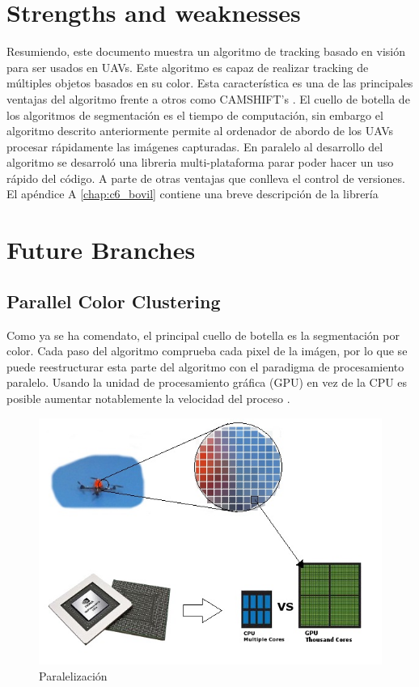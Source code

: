 \section{Strengths and weaknesses}
	Resumiendo, este documento muestra un algoritmo de tracking basado en visi\'on para ser usados en UAVs. Este algoritmo es capaz de realizar tracking de m\'ultiples objetos basados en su color. Esta caracter\'istica es una de las principales ventajas del algoritmo frente a otros como CAMSHIFT's \cite{CAMSHIFT_FAST} \cite{CAMSHIFT_ENVIROMENT}. El cuello de botella de los algoritmos de segmentaci\'on es el tiempo de computaci\'on, sin embargo el algoritmo descrito anteriormente permite al ordenador de abordo de los UAVs procesar r\'apidamente las im\'agenes capturadas.
	En paralelo al desarrollo del algoritmo se desarrol\'o una libreria multi-plataforma parar poder hacer un uso r\'apido del c\'odigo. A parte de otras ventajas que conlleva el control de versiones. El ap\'endice A \ref{chap:c6_bovil} contiene una breve descripci\'on de la librer\'ia
	
\section{Future Branches}	
	\subsection{Parallel Color Clustering}
	Como ya se ha comendato, el principal cuello de botella es la segmentaci\'on por color. Cada paso del algoritmo comprueba cada pixel de la im\'agen, por lo que se puede reestructurar esta parte del algoritmo con el paradigma de procesamiento paralelo. Usando la unidad de procesamiento gr\'afica (GPU) en vez de la CPU es posible aumentar notablemente la velocidad del proceso \cite{GPU_CPU_performance} \cite{GPU_parallel_image_processing} \cite{GPU_enabled_parrallel}.
		
	\begin{figure}[ph]
		\centering
		\includegraphics[width=0.7\linewidth]{../Images/c5/gpu}
		\caption{Paralelizaci\'on}
		\label{fig:gpu}
	\end{figure}


